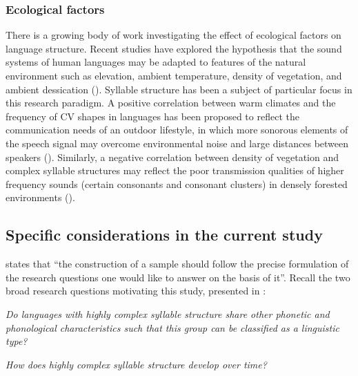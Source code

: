 \subsubsection{{Ecological} {factors}}\label{sec:2.1.2.3}

  There is a growing body of work investigating the effect of ecological factors on language structure. Recent studies have explored the hypothesis that the sound systems of human languages may be adapted to features of the natural environment such as elevation, ambient temperature, density of vegetation, and ambient dessication (\citealt{Everett2013,MaddiesonCoupé2015,EverettEtAl2016,Everett2017}). Syllable structure has been a subject of particular focus in this research paradigm. A positive correlation between warm climates and the frequency of CV shapes in languages has been proposed to reflect the communication needs of an outdoor lifestyle, in which more sonorous elements of the speech signal may overcome environmental noise and large distances between speakers (\citealt{MunroeEtAl1996,FoughtEtAl2004}). Similarly, a negative correlation between density of vegetation and complex syllable structures may reflect the poor transmission qualities of higher frequency sounds (certain consonants and consonant clusters) in densely forested environments (\citealt{MaddiesonCoupé2015}).

\subsection{Specific considerations in the current study}\label{sec:2.1.3}

  \citet[106]{Bakker2011} states that “the construction of a sample should follow the precise formulation of the research questions one would like to answer on the basis of it”. Recall the two broad research questions motivating this study, presented in :

\ea\label{ex:2.1}
   \textit{Do languages with highly complex syllable structure share other phonetic and phonological characteristics such that this group can be classified as a linguistic type?}
\z

\ea\label{ex:2.2}
   \textit{How does highly complex syllable structure develop over time?}
\z

